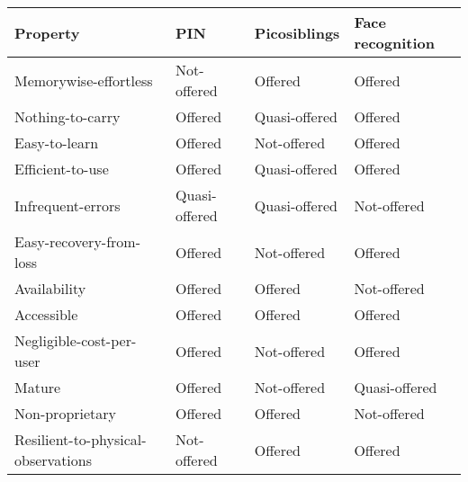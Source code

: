 \begin{table}[h]
    \begin{tabular}{l|l|l|l}
    Property                            & PIN           					& Picosiblings  					& Face recognition \\ \hline
    Memorywise-effortless               & \cellcolor{red!25}Not-offered   	& \cellcolor{green!25}Offered       & \cellcolor{green!25}Offered          \\
    Nothing-to-carry                    & \cellcolor{green!25}Offered       & \cellcolor{yellow!25}Quasi-offered   & \cellcolor{green!25}Offered          \\
    Easy-to-learn                       & \cellcolor{green!25}Offered       & \cellcolor{red!25}Not-offered   & \cellcolor{green!25}Offered          \\
    Efficient-to-use                    & \cellcolor{green!25}Offered       & \cellcolor{yellow!25}Quasi-offered & \cellcolor{green!25}Offered          \\
    Infrequent-errors                   & \cellcolor{yellow!25}Quasi-offered & \cellcolor{yellow!25}Quasi-offered & \cellcolor{red!25}Not-offered      \\
    Easy-recovery-from-loss             & \cellcolor{green!25}Offered       & \cellcolor{red!25}Not-offered   & \cellcolor{green!25}Offered          \\
    Availability                        & \cellcolor{green!25}Offered       & \cellcolor{green!25}Offered       & \cellcolor{red!25}Not-offered      \\ \hline
    Accessible                          & \cellcolor{green!25}Offered       & \cellcolor{green!25}Offered       & \cellcolor{green!25}Offered          \\
    Negligible-cost-per-user            & \cellcolor{green!25}Offered       & \cellcolor{red!25}Not-offered   & \cellcolor{green!25}Offered          \\
    Mature                              & \cellcolor{green!25}Offered       & \cellcolor{red!25}Not-offered   & \cellcolor{yellow!25}Quasi-offered    \\
    Non-proprietary                     & \cellcolor{green!25}Offered       & \cellcolor{green!25}Offered       & \cellcolor{red!25}Not-offered      \\ \hline
    Resilient-to-physical-observations  & \cellcolor{red!25}Not-offered   & \cellcolor{green!25}Offered       & \cellcolor{green!25}Offered          \\

\end{tabular}
\end{table}
